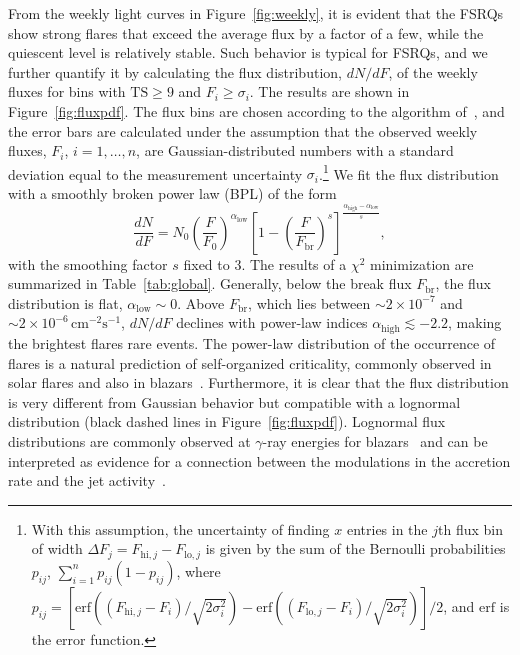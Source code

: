\documentclass[twocolumn]{aastex62}
\newcommand{\gray}{$\gamma$-ray\xspace}
\begin{document}
From the weekly light curves in Figure~\ref{fig:weekly}, it is evident that the FSRQs show strong flares that exceed the average flux by a factor of a few, while the quiescent level is relatively stable. 
Such behavior is typical for FSRQs, and we 
further quantify it by calculating the flux distribution, $dN/dF$, of the weekly fluxes for bins with $\mathrm{TS} \geqslant 9$ and $F_i \geqslant \sigma_i$. 
The results are shown in Figure~\ref{fig:fluxpdf}. The flux bins are chosen according to the algorithm of~\citet{knuth2006}, and the error bars are calculated under the assumption that the observed weekly fluxes, $F_i$, $i = 1,\ldots,n$, are Gaussian-distributed numbers with a standard deviation equal to the measurement uncertainty $\sigma_i$.\footnote{
With this assumption, the uncertainty of finding $x$ entries in the $j$th flux bin of width $\Delta F_j = F_{\mathrm{hi},j} - F_{\mathrm{lo},j}$ is given by the sum of the Bernoulli probabilities $p_{ij}$, $\sum_{i = 1}^n p_{ij}(1-p_{ij})$, where $p_{ij} =  \left[\mathrm{erf}\left((F_{\mathrm{hi},j} - F_i) / \sqrt{2\sigma_i^2}\right) - \mathrm{erf}\left((F_{\mathrm{lo},j} - F_i) / \sqrt{2\sigma_i^2}\right)\right]/2$, and $\mathrm{erf}$ is the error function.
}
We fit the flux distribution with a smoothly broken power law (BPL) of the form 
\begin{equation}
    \frac{dN}{dF} = N_0 \left( \frac{F}{F_0}\right)^{\alpha_\mathrm{low}}
        \left[ 1 - \left(\frac{F}{F_\mathrm{br}}\right)^s \right]^{\frac{\alpha_\mathrm{high} - \alpha_\mathrm{low}}{s}},
        \label{eq:dndf}
\end{equation}
with the smoothing factor $s$ fixed to 3. 
The results of a $\chi^2$ minimization are summarized in Table~\ref{tab:global}.
Generally, below the break flux $F_\mathrm{br}$, the flux distribution is flat, $\alpha_\mathrm{low}\sim 0$.
Above $F_\mathrm{br}$, 
which lies between $\sim2\times10^{-7}$ and $\sim2\times10^{-6}\,\mathrm{cm}^{-2}\mathrm{s}^{-1}$, $dN/dF$ declines  with power-law indices $\alpha_\mathrm{high} \lesssim -2.2$, making the brightest flares rare events.
The power-law distribution of the occurrence of flares is a natural prediction of self-organized criticality, commonly observed in solar flares and also in blazars~\citep[see, e.g.,][and references therein]{2016SSRv..198...47A}.    
Furthermore, it is clear that the flux distribution is very different from Gaussian behavior but
compatible with a lognormal distribution (black dashed lines in Figure~\ref{fig:fluxpdf}). 
Lognormal flux distributions are commonly observed at \gray energies for blazars~\citep[e.g.,][]{2010A&A...524A..48T,2015ApJ...810...14A,2018arXiv180504675S}
and can be interpreted as evidence for a connection between the  
modulations in the accretion rate and the jet activity~\citep{2009A&A...503..797G}.
\end{document}

